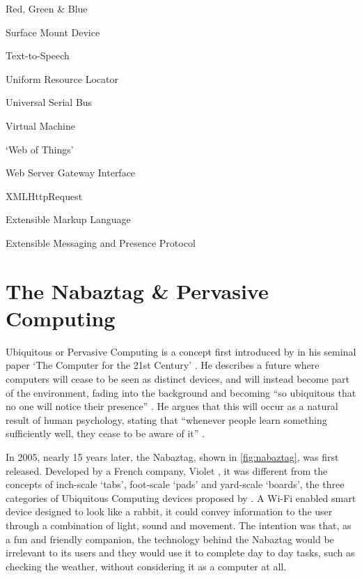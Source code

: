 \documentclass[12pt, a4paper]{article}
\begin{document}
{\begin{description}[noitemsep, leftmargin=\parindent, labelindent=\parindent]
		\item[\textbf{RGB}] Red, Green \& Blue
		\item[\textbf{SMD}] Surface Mount Device
		\item[\textbf{TTS}] Text-to-Speech
		\item[\textbf{URL}] Uniform Resource Locator
		\item[\textbf{USB}] Universal Serial Bus
		\item[\textbf{VM}] Virtual Machine
		\item[\textbf{WoT}] `Web of Things'
		\item[\textbf{WSGI}] Web Server Gateway Interface
		\item[\textbf{XHR}] XMLHttpRequest
		\item[\textbf{XML}] Extensible Markup Language
		\item[\textbf{XMPP}] Extensible Messaging and Presence Protocol
	\end{description}
	}
	\newpage
	
	\section{The Nabaztag \& Pervasive Computing}\label{sec:nabaztaghist}
	
		Ubiquitous or Pervasive Computing is a concept first introduced by \citeauthor{Weiser1991} in his seminal paper `The Computer for the 21st Century' \parencite{Weiser1991}. He describes a future where computers will cease to be seen as distinct devices, and will instead become part of the environment, fading into the background and becoming ``so ubiquitous that no one will notice their presence'' \parencite{Weiser1991}. He argues that this will occur as a natural result of human psychology, stating that ``whenever people learn something sufficiently well, they cease to be aware of it'' \parencite{Weiser1991}.
		
		In 2005, nearly 15 years later, the Nabaztag, shown in \autoref{fig:nabaztag}, was first released. Developed by a French company, Violet \parencite{violetsite}, it was different from the concepts of inch-scale `tabs', foot-scale `pads' and yard-scale `boards', the three categories of Ubiquitous Computing devices proposed by \citeauthor{Weiser1991} \parencite{Weiser1991}. A Wi-Fi enabled smart device designed to look like a rabbit, it could convey information to the user through a combination of light, sound and movement. The intention was that, as a fun and friendly companion, the technology behind the Nabaztag would be irrelevant to its users and they would use it to complete day to day tasks, such as checking the weather, without considering it as a computer at all.
		
\end{document}
